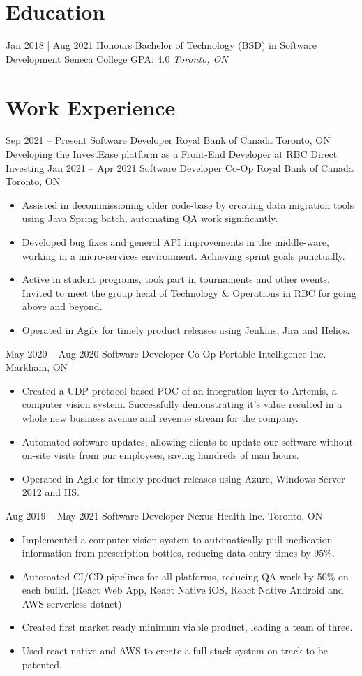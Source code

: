 \documentclass[letterpaper]{moderncv}
\begin{document}
\makecvtitle
    

\section{Education}
\cventry
{Jan 2018 | Aug 2021}
{Honours Bachelor of Technology (BSD) in Software Development}
{Seneca College}
{GPA: 4.0}
{\textit{Toronto, ON}}
{}
\section{Work Experience}
\cventry
{Sep 2021 -- Present}
{Software Developer}
{Royal Bank of Canada}
{Toronto, ON}
{}
{Developing the InvestEase platform as a Front-End Developer at RBC Direct Investing}
\cventry
{Jan 2021 -- Apr 2021}
{Software Developer Co-Op}
{Royal Bank of Canada}
{Toronto, ON}
{}
{\begin{itemize}%
	\item Assisted in decommissioning older code-base by creating data migration tools using Java Spring batch, automating QA work significantly.
	\item Developed bug fixes and general API improvements in the middle-ware, working in a micro-services environment. Achieving sprint goals punctually.
	\item Active in student programs, took part in tournaments and other events. Invited to meet the group head of Technology \& Operations in RBC for going above and beyond.
	\item Operated in Agile for timely product releases using Jenkins, Jira and Helios.
	\end{itemize}}
\cventry
{May 2020 -- Aug 2020}
{Software Developer Co-Op}
{Portable Intelligence Inc.}
{Markham, ON}
{}
{\begin{itemize}%
	\item Created a UDP protocol based POC of an integration layer to Artemis, a computer vision system. Successfully demonstrating it's value resulted in a whole new business avenue and revenue stream for the company.
	\item Automated software updates, allowing clients to update our software without on-site visits from our employees, saving hundreds of man hours.
	\item Operated in Agile for timely product releases using Azure, Windows Server 2012 and IIS.
	\end{itemize}}
\cventry
{Aug 2019 -- May 2021}
{Software Developer}
{Nexus Health Inc.}
{Toronto, ON}
{}
{\begin{itemize}%
    \item Implemented a computer vision system to automatically pull medication information from prescription bottles, reducing data entry times by 95\%.
    \item Automated CI/CD pipelines for all platforms, reducing QA work by 50\% on each build. (React Web App, React Native iOS, React Native Android and AWS serverless dotnet)
	\item Created first market ready minimum viable product, leading a team of three.
	\item Used react native and AWS to create a full stack system on track to be patented.
	\end{itemize}}
\end{document}
